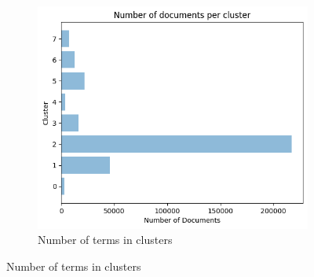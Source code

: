 \documentclass[a4paper, 12pt]{article}
\begin{document}
\begin{figure}[H]
    \centering
    \begin{subfigure}[a]{0.6\textwidth}
        \includegraphics[width=\textwidth]{res/k8.png}
        \caption{Number of terms in clusters}
    \end{subfigure}
\end{figure}
\end{document}
